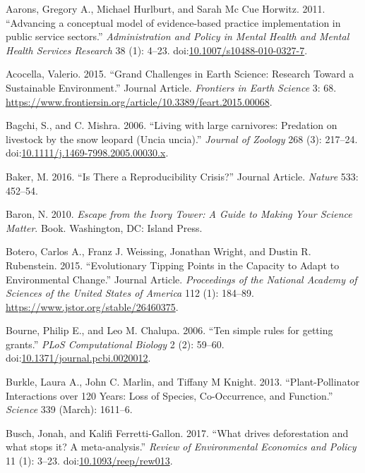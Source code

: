 \documentclass[fleqn,10pt]{wlpeerj} %
\begin{document}
\hypertarget{refs}{}
\hypertarget{ref-Aarons2011}{}
Aarons, Gregory A., Michael Hurlburt, and Sarah Mc Cue Horwitz. 2011.
``Advancing a conceptual model of evidence-based practice implementation
in public service sectors.'' \emph{Administration and Policy in Mental
Health and Mental Health Services Research} 38 (1): 4--23.
doi:\href{https://doi.org/10.1007/s10488-010-0327-7}{10.1007/s10488-010-0327-7}.

\hypertarget{ref-Acocella2015}{}
Acocella, Valerio. 2015. ``Grand Challenges in Earth Science: Research
Toward a Sustainable Environment.'' Journal Article. \emph{Frontiers in
Earth Science} 3: 68.
\url{https://www.frontiersin.org/article/10.3389/feart.2015.00068}.

\hypertarget{ref-Bagchi2006}{}
Bagchi, S., and C. Mishra. 2006. ``Living with large carnivores:
Predation on livestock by the snow leopard (Uncia uncia).''
\emph{Journal of Zoology} 268 (3): 217--24.
doi:\href{https://doi.org/10.1111/j.1469-7998.2005.00030.x}{10.1111/j.1469-7998.2005.00030.x}.

\hypertarget{ref-Baker2016}{}
Baker, M. 2016. ``Is There a Reproducibility Crisis?'' Journal Article.
\emph{Nature} 533: 452--54.

\hypertarget{ref-Baron2010}{}
Baron, N. 2010. \emph{Escape from the Ivory Tower: A Guide to Making
Your Science Matter}. Book. Washington, DC: Island Press.

\hypertarget{ref-Botero2015}{}
Botero, Carlos A., Franz J. Weissing, Jonathan Wright, and Dustin R.
Rubenstein. 2015. ``Evolutionary Tipping Points in the Capacity to Adapt
to Environmental Change.'' Journal Article. \emph{Proceedings of the
National Academy of Sciences of the United States of America} 112 (1):
184--89. \url{https://www.jstor.org/stable/26460375}.

\hypertarget{ref-Bourne2006}{}
Bourne, Philip E., and Leo M. Chalupa. 2006. ``Ten simple rules for
getting grants.'' \emph{PLoS Computational Biology} 2 (2): 59--60.
doi:\href{https://doi.org/10.1371/journal.pcbi.0020012}{10.1371/journal.pcbi.0020012}.

\hypertarget{ref-Burkle2013}{}
Burkle, Laura A., John C. Marlin, and Tiffany M Knight. 2013.
``Plant-Pollinator Interactions over 120 Years: Loss of Species,
Co-Occurrence, and Function.'' \emph{Science} 339 (March): 1611--6.

\hypertarget{ref-Busch2017}{}
Busch, Jonah, and Kalifi Ferretti-Gallon. 2017. ``What drives
deforestation and what stops it? A meta-analysis.'' \emph{Review of
Environmental Economics and Policy} 11 (1): 3--23.
doi:\href{https://doi.org/10.1093/reep/rew013}{10.1093/reep/rew013}.
\end{document}
